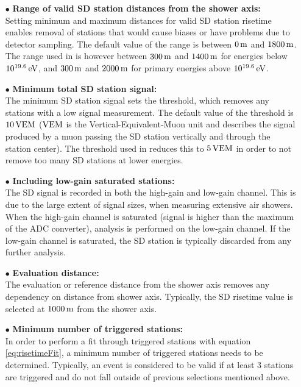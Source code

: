 \documentclass[12pt,a4paper]{report}
\begin{document}
\begin{itemize}
\item[$\bullet$] \textbf{Range of valid SD station distances from the shower axis:}\\
Setting minimum and maximum distances for valid SD station risetime enables removal of stations that would cause biases or have problems due to detector sampling. The default value of the range is between $\unit[0]{m}$ and $\unit[1800]{m}$. The range used in \cite{deltaMethod} is however between $\unit[300]{m}$ and $\unit[1400]{m}$ for energies below $\unit[10^{19.6}]{eV}$, and $\unit[300]{m}$ and $\unit[2000]{m}$ for primary energies above $\unit[10^{19.6}]{eV}$.
\item[$\bullet$] \textbf{Minimum total SD station signal:}\\
The minimum SD station signal sets the threshold, which removes any stations with a low signal measurement. The default value of the threshold is $\unit[10]{VEM}$ ($\unit[]{VEM}$ is the Vertical-Equivalent-Muon unit and describes the signal produced by a muon passing the SD station vertically and through the station center). The threshold used in \cite{deltaMethod} reduces this to $\unit[5]{VEM}$ in order to not remove too many SD stations at lower energies.
\item[$\bullet$] \textbf{Including low-gain saturated stations:}\\
The SD signal is recorded in both the high-gain and low-gain channel. This is due to the large extent of signal sizes, when measuring extensive air showers. When the high-gain channel is saturated (signal is higher than the maximum of the ADC converter), analysis is performed on the low-gain channel. If the low-gain channel is saturated, the SD station is typically discarded from any further analysis.
\item[$\bullet$] \textbf{Evaluation distance:}\\
The evaluation or reference distance from the shower axis removes any dependency on distance from shower axis. Typically, the SD risetime value is selected at $\unit[1000]{m}$ from the shower axis.
\item[$\bullet$] \textbf{Minimum number of triggered stations:}\\
In order to perform a fit through triggered stations with equation \eqref{eq:risetimeFit}, a minimum number of triggered stations needs to be determined. Typically, an event is considered to be valid if at least 3 stations are triggered and do not fall outside of previous selections mentioned above.
\end{itemize}
\end{document}
